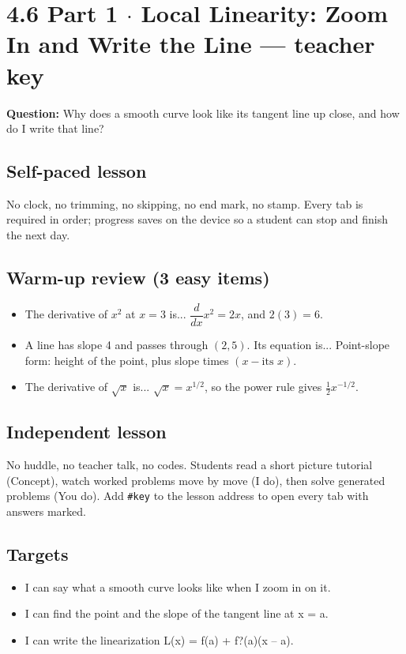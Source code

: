 \documentclass[11pt]{article}
\begin{document}
\section*{4.6 Part 1 $\cdot$ Local Linearity: Zoom In and Write the Line --- teacher key}
\textbf{Question:} Why does a smooth curve look like its tangent line up close, and how do I write that line?\par
\subsection*{Self-paced lesson}No clock, no trimming, no skipping, no end mark, no stamp. Every tab is required in order; progress saves on the device so a student can stop and finish the next day.\par
\subsection*{Warm-up review (3 easy items)}\begin{itemize}
\item The derivative of $x^2$ at $x=3$ is...  $\dfrac{d}{dx}x^2=2x$, and $2(3)=6$.
\item A line has slope 4 and passes through $(2, 5)$. Its equation is...  Point-slope form: height of the point, plus slope times $(x-\text{its }x)$.
\item The derivative of $\sqrt{x}$ is...  $\sqrt{x}=x^{1/2}$, so the power rule gives $\tfrac12x^{-1/2}$.
\end{itemize}
\subsection*{Independent lesson}No huddle, no teacher talk, no codes. Students read a short picture tutorial (Concept), watch worked problems move by move (I do), then solve generated problems (You do). Add \texttt{\#key} to the lesson address to open every tab with answers marked.\par
\subsection*{Targets}\begin{itemize}\item I can say what a smooth curve looks like when I zoom in on it.
\item I can find the point and the slope of the tangent line at x = a.
\item I can write the linearization L(x) = f(a) + f?(a)(x -- a).\end{itemize}
\end{document}
